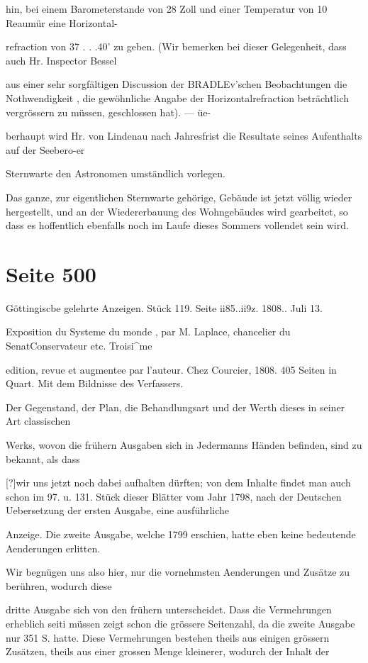 \documentclass[10pt,a4paper]{article}
\begin{document}
hin, bei einem Barometerstande von 28 Zoll und einer Temperatur von 10\textdegree{} Reaumür eine Horizontal-

refraction von 37 . . .40' zu geben. (Wir bemerken bei dieser Gelegenheit, dass auch Hr. Inspector Bessel

aus einer sehr sorgfältigen Discussion der BRADLEv'schen Beobachtungen die Nothwendigkeit , die gewöhnliche Angabe der Horizontalrefraction beträchtlich vergrössern zu müssen, geschlossen hat). — üe-

berhaupt wird Hr. von Lindenau nach Jahresfrist die Resultate seines Aufenthalts auf der Seebero-er

Sternwarte den Astronomen umständlich vorlegen.

Das ganze, zur eigentlichen Sternwarte gehörige, Gebäude ist jetzt völlig wieder hergestellt, und an der Wiedererbauung des Wohngebäudes wird gearbeitet, so dass es hoffentlich ebenfalls noch im Laufe dieses Sommers vollendet sein wird.


\newpage
\section*{Seite 500}
Göttingiscbe gelehrte Anzeigen. Stück 119. Seite ii85..ii9z. 1808.. Juli 13.

Exposition du Systeme du monde , par M. Laplace, chancelier du SenatConservateur etc. Troisi\textasciicircum{}me

edition, revue et augmentee par l'auteur. Chez Courcier, 1808. 405 Seiten in Quart. Mit dem Bildnisse des Verfassers.

Der Gegenstand, der Plan, die Behandlungsart und der Werth dieses in seiner Art classischen

Werks, wovon die frühern Ausgaben sich in Jedermanns Händen befinden, sind zu bekannt, als dass

[?]wir uns jetzt noch dabei aufhalten dürften; von dem Inhalte findet man auch schon im 97. u. 131. Stück dieser Blätter vom Jahr 1798, nach der Deutschen Uebersetzung der ersten Ausgabe, eine ausführliche

Anzeige. Die zweite Ausgabe, welche 1799 erschien, hatte eben keine bedeutende Aenderungen erlitten.

Wir begnügen uns also hier, nur die vornehmsten Aenderungen und Zusätze zu berühren, wodurch diese

dritte Ausgabe sich von den frühern unterscheidet. Dass die Vermehrungen erheblich seiti müssen zeigt schon die grössere Seitenzahl, da die zweite Ausgabe nur 351 S. hatte. Diese Vermehrungen bestehen theils aus einigen grössern Zusätzen, theils aus einer grossen Menge kleinerer, wodurch der Inhalt der
\end{document}
